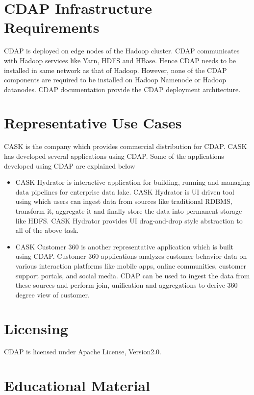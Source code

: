 \documentclass[9pt,twocolumn,twoside]{styles/osajnl}
\begin{document}
\section{CDAP Infrastructure Requirements}

CDAP is deployed on edge nodes of the Hadoop cluster. CDAP communicates with
Hadoop services like Yarn, HDFS and HBase. Hence CDAP needs to be installed
in same network as that of Hadoop. However, none of the CDAP components are
required to be installed on Hadoop Namenode or Hadoop datanodes. CDAP
documentation \cite{www-cdap-deployment} provide the CDAP deployment
architecture.

\section{Representative Use Cases}

CASK \cite{www-cask-io} is the company which provides commercial distribution
for CDAP. CASK has developed several applications using CDAP.
Some of the applications developed using CDAP are explained below
\begin{itemize}
\item CASK Hydrator \cite{www-cask-hydrator} is interactive application for
building, running and managing data pipelines for enterprise data lake.
CASK Hydrator is UI driven tool using which users can ingest data from
sources like traditional RDBMS, transform it,
aggregate it and finally store the data into permanent storage like HDFS.
CASK Hydrator provides UI drag-and-drop style abstraction to all of the above
 task.
\item CASK Customer 360 \cite{www-cask-customer360} is another representative
 application which is built using CDAP. Customer 360 applications analyzes
 customer behavior data on various interaction platforms like mobile apps,
 online communities, customer support portals, and social media. CDAP can be
 used to ingest the data from these sources and perform join, unification and
  aggregations to derive 360 degree view of customer.
\end{itemize}

\section{Licensing}
CDAP is licensed \cite{www-cdap-license}under Apache License, Version2.0.

\section{Educational Material}
\end{document}
